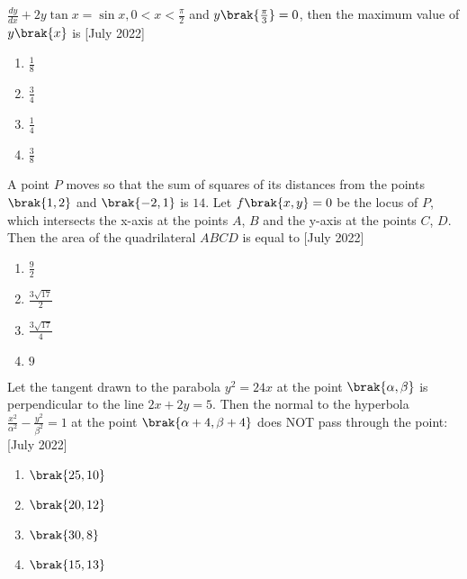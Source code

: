         \item $\frac{dy}{dx} + 2y \tan x = \sin x, 0<x<\frac{\pi}{2}$ and $y\brak{\frac{\pi}{3}} = 0$, then the maximum value of $y\brak{x}$ is \hfill{[July 2022]}
        \begin{multicols}{2}
            \begin{enumerate}
                \item $\frac{1}{8}$
                \item $\frac{3}{4}$
                \item $\frac{1}{4}$
                \item $\frac{3}{8}$
            \end{enumerate}
        \end{multicols}

        \item A point $P$ moves so that the sum of squares of its distances from the points $\brak{1,2}$ and $\brak{-2,1}$ is $14$. Let $f\brak{x,y} = 0$ be the locus of $P$, which intersects the x-axis at the points $A$, $B$ and the y-axis at the points $C$, $D$. Then the area of the quadrilateral $ABCD$ is equal to \hfill{[July 2022]}
        \begin{multicols}{2}
            \begin{enumerate}
                \item $\frac{9}{2}$
                \item $\frac{3\sqrt{17}}{2}$
                \item $\frac{3\sqrt{17}}{4}$
                \item $9$
                
            \end{enumerate}
        \end{multicols}
        \item Let the tangent drawn to the parabola $y^2 = 24x$ at the point $\brak{\alpha,\beta}$ is perpendicular to the line $2x+2y = 5$. Then the normal to the hyperbola $\frac{x^2}{\alpha^2} - \frac{y^2}{\beta^2} = 1$ at the point $\brak{\alpha+4,\beta+4}$ does NOT pass through the point: \hfill{[July 2022]}
        \begin{multicols}{2}
            \begin{enumerate}
                \item $\brak{25,10}$
                \item $\brak{20,12}$
                \item $\brak{30,8}$
                \item $\brak{15,13}$
            \end{enumerate}
        \end{multicols}
